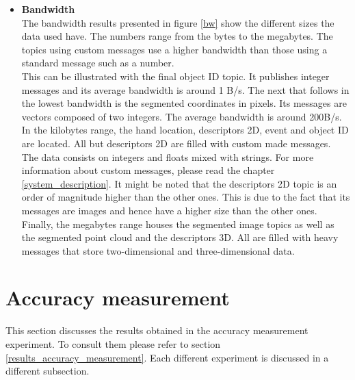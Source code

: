 \begin{itemize}
			\\

			\item{\textbf{Bandwidth}}\\

			The  bandwidth results presented in figure \ref{bw} show the different sizes the data used have. 
			The numbers range from the bytes to the megabytes. 
			The topics using custom messages use a higher bandwidth than those using a standard message such as a number. 
			\\

			This can be illustrated with the final object ID topic. 
			It publishes integer messages and its average bandwidth is around 1 B/s. 
			The next that follows in the lowest bandwidth is the segmented coordinates in pixels. 
			Its messages are vectors composed of two integers. 
			The average bandwidth is around 200B/s. 
			\\

			In the kilobytes range, the hand location, descriptors 2D, event and object ID are located. 
			All but descriptors 2D are filled with custom made messages. 
			The data consists on integers and floats mixed with strings. 
			For more information about custom messages, please read the chapter \ref{system_description}.
			It might be noted that the descriptors 2D topic is an order of magnitude higher than the other ones. 
			This is due to the fact that its messages are images and hence have a higher size than the other ones. 
			\\

			Finally, the megabytes range houses the segmented image topics as well as the segmented point cloud and the descriptors 3D. 
			All are filled with heavy messages that store two-dimensional and three-dimensional data. 
		\end{itemize}

\section{Accuracy measurement}
	This section discusses the results obtained in the accuracy measurement experiment. 
	To consult them please refer to section \ref{results_accuracy_measurement}.
	Each different experiment is discussed in a different subsection.


